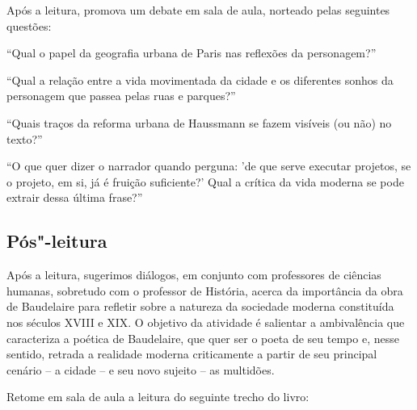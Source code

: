 \documentclass[12pt]{extarticle}
\begin{document}
Após a leitura, promova um debate em sala de aula, norteado pelas seguintes questões:

``Qual o papel da geografia urbana de Paris nas reflexões da personagem?''

``Qual a relação entre a vida movimentada da cidade e os diferentes sonhos da personagem que passea pelas ruas e parques?''

``Quais traços da reforma urbana de Haussmann se fazem visíveis (ou não) no texto?''

``O que quer dizer o narrador quando perguna: 'de que serve executar projetos, se o projeto, em si, já é fruição suficiente?' Qual a crítica da vida moderna se pode extrair dessa última frase?''

\subsection{Pós"-leitura}

Após a leitura, sugerimos diálogos, em conjunto com
professores de ciências humanas, sobretudo com o professor de História, acerca da importância da obra de Baudelaire para refletir sobre
a natureza da sociedade moderna constituída nos séculos XVIII e XIX. O objetivo da atividade é salientar a ambivalência que caracteriza a poética de Baudelaire, que quer ser o poeta de seu tempo e, nesse sentido, retrada a realidade moderna criticamente a partir de seu principal cenário -- a cidade -- e seu novo sujeito -- as multidões.

Retome em sala de aula a leitura do seguinte trecho do livro:
\end{document}
